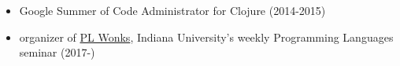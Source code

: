 \documentclass[10pt,a4paper]{article}
\begin{document}

\bodytext
  {
\begin{itemize}
  \item Google Summer of Code Administrator for Clojure (2014-2015)
  \item organizer of \href{http://wonks.github.io}{PL Wonks}, Indiana University's weekly Programming Languages seminar
    (2017-)
\end{itemize}
    }


%


\end{document}
